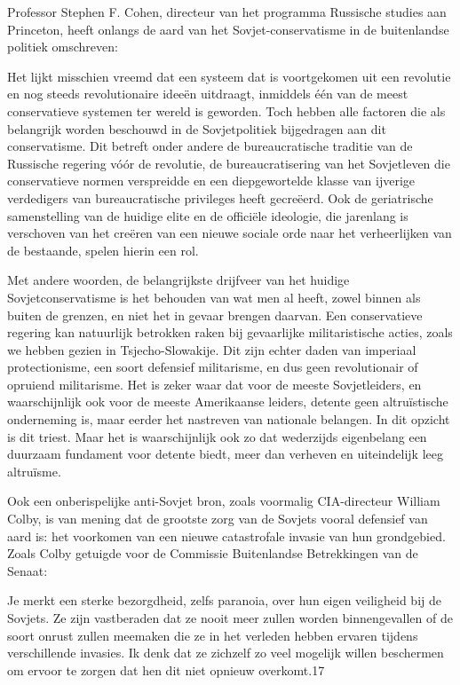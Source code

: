 \documentclass[
  a5paper,
  smalldemyvopaper,10pt,twoside,onecolumn,openright,extrafontsizes,hidelinks]{memoir}
\renewenvironment{quote}%
               {\list{}{\rightmargin=.6cm\leftmargin=.6cm}%
                \itshape \item[]}%
               {\endlist}
\begin{document}
Professor Stephen F. Cohen, directeur van het programma Russische
studies aan Princeton, heeft onlangs de aard van het
Sovjet-conservatisme in de buitenlandse politiek omschreven:

\begin{quote}
Het lijkt misschien vreemd dat een systeem dat is voortgekomen uit een
revolutie en nog steeds revolutionaire ideeën uitdraagt, inmiddels één
van de meest conservatieve systemen ter wereld is geworden. Toch hebben
alle factoren die als belangrijk worden beschouwd in de Sovjetpolitiek
bijgedragen aan dit conservatisme. Dit betreft onder andere de
bureaucratische traditie van de Russische regering vóór de revolutie, de
bureaucratisering van het Sovjetleven die conservatieve normen
verspreidde en een diepgewortelde klasse van ijverige verdedigers van
bureaucratische privileges heeft gecreëerd. Ook de geriatrische
samenstelling van de huidige elite en de officiële ideologie, die
jarenlang is verschoven van het creëren van een nieuwe sociale orde naar
het verheerlijken van de bestaande, spelen hierin een rol.

Met andere woorden, de belangrijkste drijfveer van het huidige
Sovjetconservatisme is het behouden van wat men al heeft, zowel binnen
als buiten de grenzen, en niet het in gevaar brengen daarvan. Een
conservatieve regering kan natuurlijk betrokken raken bij gevaarlijke
militaristische acties, zoals we hebben gezien in Tsjecho-Slowakije. Dit
zijn echter daden van imperiaal protectionisme, een soort defensief
militarisme, en dus geen revolutionair of opruiend militarisme. Het is
zeker waar dat voor de meeste Sovjetleiders, en waarschijnlijk ook voor
de meeste Amerikaanse leiders, detente geen altruïstische onderneming
is, maar eerder het nastreven van nationale belangen. In dit opzicht is
dit triest. Maar het is waarschijnlijk ook zo dat wederzijds eigenbelang
een duurzaam fundament voor detente biedt, meer dan verheven en
uiteindelijk leeg altruïsme.
\end{quote}

Ook een onberispelijke anti-Sovjet bron, zoals voormalig CIA-directeur
William Colby, is van mening dat de grootste zorg van de Sovjets vooral
defensief van aard is: het voorkomen van een nieuwe catastrofale invasie
van hun grondgebied. Zoals Colby getuigde voor de Commissie Buitenlandse
Betrekkingen van de Senaat:

\begin{quote}
Je merkt een sterke bezorgdheid, zelfs paranoia, over hun eigen
veiligheid bij de Sovjets. Ze zijn vastberaden dat ze nooit meer zullen
worden binnengevallen of de soort onrust zullen meemaken die ze in het
verleden hebben ervaren tijdens verschillende invasies. Ik denk dat ze
zichzelf zo veel mogelijk willen beschermen om ervoor te zorgen dat hen
dit niet opnieuw overkomt.17
\end{quote}
\end{document}
